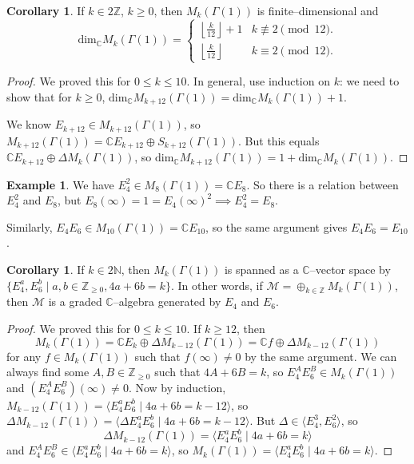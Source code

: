 \documentclass{article}
\theoremstyle{definition}
\newtheorem{cor}[theorem]{Corollary}
\newtheorem{example}{Example}[section]
\begin{document}
\begin{cor}
    If $k \in 2\mathbb{Z}$, $k\ge 0$, then $M_k(\Gamma(1))$ is finite--dimensional and $$\text{dim}_{\mathbb{C}}M_k(\Gamma(1)) = \begin{cases}
        \left\lfloor \frac{k}{12} \right\rfloor + 1 & k \not\equiv 2 \pmod{12}.\\
        \left\lfloor \frac{k}{12} \right\rfloor & k \equiv 2 \pmod{12}.
    \end{cases}$$
\end{cor}
\begin{proof}
    We proved this for $0\le k \le 10$. In general, use induction on $k$: we need to show that for $k\ge 0$, $\text{dim}_{\mathbb{C}}M_{k+12}(\Gamma(1)) = \text{dim}_{\mathbb{C}}M_k(\Gamma(1)) + 1$.
    \vspace{1mm}
     
    We know $E_{k+12} \in M_{k+12}(\Gamma(1))$, so $M_{k+12}(\Gamma(1)) = \mathbb{C} E_{k+12} \oplus S_{k+12}(\Gamma(1))$. But this equals $\mathbb{C} E_{k+12} \oplus \Delta M_k(\Gamma(1))$, so $\text{dim}_{\mathbb{C}} M_{k+12}(\Gamma(1)) = 1 + \text{dim}_{\mathbb{C}}M_k(\Gamma(1))$.
\end{proof}
\begin{example}
    We have $E_4^2 \in M_8(\Gamma(1)) = \mathbb{C} E_8$. So there is a relation between $E_4^2$ and $E_8$, but $E_8(\infty) = 1 = E_4(\infty)^2 \implies E_4^2 = E_8$.
    \vspace{1mm}
     
    Similarly, $E_4E_6 \in M_{10}(\Gamma(1)) = \mathbb{C} E_{10}$, so the same argument gives $E_4 E_6 = E_{10}$.
\end{example}
\begin{cor}
    If $k \in 2\mathbb{N}$, then $M_k(\Gamma(1))$ is spanned as a $\mathbb{C}$--vector space by $\{E_4^a, E_6^b \mid a,b \in \mathbb{Z}_{\ge 0}, 4a+6b=k\}$. In other words, if $\mathcal{M} = \oplus_{k \in \mathbb{Z}}M_k(\Gamma(1))$, then $\mathcal{M}$ is a graded $\mathbb{C}$--algebra generated by $E_4$ and $E_6$.
\end{cor}
\begin{proof}
    We proved this for $0\le k\le 10$. If $k\ge 12$, then $$M_k(\Gamma(1)) = \mathbb{C} E_k \oplus \Delta M_{k-12}(\Gamma(1)) = \mathbb{C} f \oplus \Delta M_{k-12}(\Gamma(1))$$ for any $f \in M_k(\Gamma(1))$ such that $f(\infty) \neq 0$ by the same argument. We can always find some $A,B \in \mathbb{Z}_{\ge 0}$ such that $4A+6B = k$, so $E_4^A E_6^B \in M_k(\Gamma(1))$ and $(E_4^A E_6^B)(\infty) \neq 0$. Now by induction, $M_{k-12}(\Gamma(1)) = \langle E_4^a E_6^b \mid 4a+6b = k-12 \rangle$, so $\Delta M_{k-12}(\Gamma(1)) = \langle \Delta E_4^a E_6^b \mid 4a+6b = k -12 \rangle$. But $\Delta \in \langle E_4^3, E_6^2 \rangle$, so \[
    \Delta M_{k-12}(\Gamma(1)) = \langle E_4^a E_6^b \mid 4a+6b = k \rangle
    \]
    and $E_4^A E_6^B \in \langle E_4^a E_6^b \mid 4a+6b = k \rangle$, so $M_k(\Gamma(1)) = \langle E_4^a E_6^b \mid 4a+6b = k \rangle$.
\end{proof}
\end{document}

